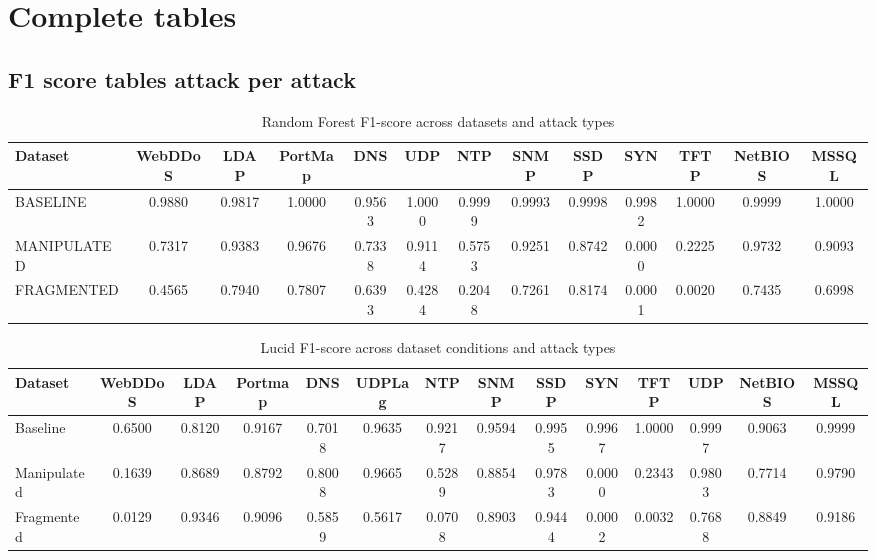\chapter{Complete tables}
\section{F1 score tables attack per attack}
\begin{table}[htbp]
\centering
\scriptsize
\setlength{\tabcolsep}{4pt}
\begin{tabular}{l|cccccccccccc}
\hline
Dataset &
WebDDoS &
LDAP &
PortMap &
DNS &
UDP &
NTP &
SNMP &
SSDP &
SYN &
TFTP &
NetBIOS &
MSSQL \\
\hline
BASELINE &
0.9880 &
0.9817 &
1.0000 &
0.9563 &
1.0000 &
0.9999 &
0.9993 &
0.9998 &
0.9982 &
1.0000 &
0.9999 &
1.0000 \\
\hline
MANIPULATED &
0.7317 &
0.9383 &
0.9676 &
0.7338 &
0.9114 &
0.5753 &
0.9251 &
0.8742 &
0.0000 &
0.2225 &
0.9732 &
0.9093 \\
\hline
FRAGMENTED &
0.4565 &
0.7940 &
0.7807 &
0.6393 &
0.4284 &
0.2048 &
0.7261 &
0.8174 &
0.0001 &
0.0020 &
0.7435 &
0.6998 \\
\hline
\end{tabular}
\caption{Random Forest F1-score across datasets and attack types}
\label{tab:rf_f1}
\end{table}

\begin{table}[htbp]
\centering
\scriptsize
\setlength{\tabcolsep}{3pt}
\begin{tabular}{l|ccccccccccccc}
\hline
Dataset &
WebDDoS &
LDAP &
Portmap &
DNS &
UDPLag &
NTP &
SNMP &
SSDP &
SYN &
TFTP &
UDP &
NetBIOS &
MSSQL \\
\hline
Baseline &
0.6500 & 0.8120 & 0.9167 & 0.7018 & 0.9635 & 0.9217 & 0.9594 & 0.9955 & 0.9967 & 1.0000 & 0.9997 & 0.9063 & 0.9999 \\
\hline
Manipulated &
0.1639 & 0.8689 & 0.8792 & 0.8008 & 0.9665 & 0.5289 & 0.8854 & 0.9783 & 0.0000 & 0.2343 & 0.9803 & 0.7714 & 0.9790 \\
\hline
Fragmented &
0.0129 & 0.9346 & 0.9096 & 0.5859 & 0.5617 & 0.0708 & 0.8903 & 0.9444 & 0.0002 & 0.0032 & 0.7688 & 0.8849 & 0.9186 \\
\hline
\end{tabular}
\caption{Lucid F1-score across dataset conditions and attack types}
\label{tab:lucid_f1}
\end{table}

